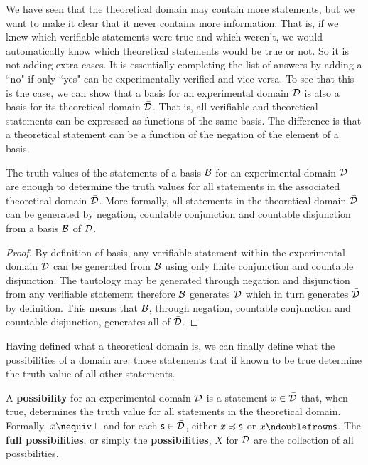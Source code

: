 \documentclass[11pt,letterpaper,fleqn]{memoir} %
\begin{document}
We have seen that the theoretical domain may contain more statements, but we want to make it clear that it never contains more information. That is, if we knew which verifiable statements were true and which weren't, we would automatically know which theoretical statements would be true or not. So it is not adding extra cases. It is essentially completing the list of answers by adding a ``no" if only ``yes" can be experimentally verified and vice-versa. To see that this is the case, we can show that a basis for an experimental domain $\mathcal{D}$ is also a basis for its theoretical domain $\bar{\mathcal{D}}$. That is, all verifiable and theoretical statements can be expressed as functions of the same basis. The difference is that a theoretical statement can be a function of the negation of the element of a basis.

\begin{mathSection}
\begin{prop}\label{prop_basis_for_theoretical_domain}
	The truth values of the statements of a basis $\mathcal{B}$ for an experimental domain $\mathcal{D}$ are enough to determine the truth values for all statements in the associated theoretical domain $\bar{\mathcal{D}}$. More formally, all statements in the theoretical domain $\bar{\mathcal{D}}$ can be generated by negation, countable conjunction and countable disjunction from a basis $\mathcal{B}$ of $\mathcal{D}$.
\end{prop}

\begin{proof}
	By definition of basis, any verifiable statement within the experimental domain $\mathcal{D}$ can be generated from $\mathcal{B}$ using only finite conjunction and countable disjunction. The tautology may be generated through negation and disjunction from any verifiable statement therefore $\mathcal{B}$ generates $\mathcal{D}$ which in turn generates $\bar{\mathcal{D}}$ by definition. This means that $\mathcal{B}$, through negation, countable conjunction and countable disjunction, generates all of $\bar{\mathcal{D}}$.
\end{proof}
\end{mathSection}

Having defined what a theoretical domain is, we can finally define what the possibilities of a domain are: those statements that if known to be true determine the truth value of all other statements.

\begin{mathSection}

\begin{defn}
	A \textbf{possibility} for an experimental domain $\mathcal{D}$ is a statement $x \in \bar{\mathcal{D}}$ that, when true, determines the truth value for all statements in the theoretical domain. Formally, $x \nequiv \contradiction$ and for each $\mathsf{s} \in \bar{\mathcal{D}}$, either $x \preccurlyeq \mathsf{s}$ or $x \ncomp \mathsf{s}$. The \textbf{full possibilities}, or simply the \textbf{possibilities}, $X$ for $\mathcal{D}$ are the collection of all possibilities.
\end{defn}

\end{mathSection}
\end{document}
